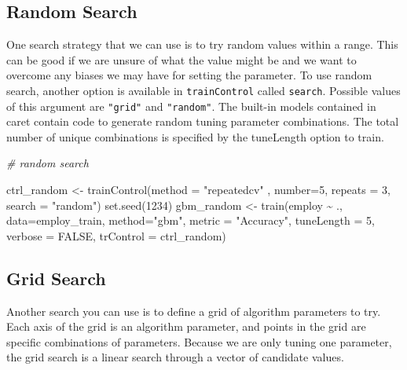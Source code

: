 \documentclass[
]{book}
\newenvironment{Shaded}{\begin{snugshade}}{\end{snugshade}}
\newcommand{\AttributeTok}[1]{\textcolor[rgb]{0.77,0.63,0.00}{#1}}
\newcommand{\CommentTok}[1]{\textcolor[rgb]{0.56,0.35,0.01}{\textit{#1}}}
\newcommand{\ConstantTok}[1]{\textcolor[rgb]{0.00,0.00,0.00}{#1}}
\newcommand{\DecValTok}[1]{\textcolor[rgb]{0.00,0.00,0.81}{#1}}
\newcommand{\FunctionTok}[1]{\textcolor[rgb]{0.00,0.00,0.00}{#1}}
\newcommand{\NormalTok}[1]{#1}
\newcommand{\OtherTok}[1]{\textcolor[rgb]{0.56,0.35,0.01}{#1}}
\newcommand{\SpecialCharTok}[1]{\textcolor[rgb]{0.00,0.00,0.00}{#1}}
\newcommand{\StringTok}[1]{\textcolor[rgb]{0.31,0.60,0.02}{#1}}
\begin{document}
\hypertarget{random-search}{%
\subsection{Random Search}\label{random-search}}

One search strategy that we can use is to try random values within a range. This can be good if we are unsure of what the value might be and we want to overcome any biases we may have for setting the parameter.
To use random search, another option is available in \texttt{trainControl} called \texttt{search}. Possible values of this argument are \texttt{"grid"} and \texttt{"random"}. The built-in models contained in caret contain code to generate random tuning parameter combinations. The total number of unique combinations is specified by the tuneLength option to train.

\begin{Shaded}
\begin{Highlighting}[]
\CommentTok{\# random search}

\NormalTok{ctrl\_random }\OtherTok{\textless{}{-}} \FunctionTok{trainControl}\NormalTok{(}\AttributeTok{method =} \StringTok{"repeatedcv"}\NormalTok{ , }\AttributeTok{number=}\DecValTok{5}\NormalTok{, }
                            \AttributeTok{repeats =} \DecValTok{3}\NormalTok{, }
                           \AttributeTok{search =} \StringTok{"random"}\NormalTok{)}
\FunctionTok{set.seed}\NormalTok{(}\DecValTok{1234}\NormalTok{)}
\NormalTok{gbm\_random }\OtherTok{\textless{}{-}} \FunctionTok{train}\NormalTok{(employ }\SpecialCharTok{\textasciitilde{}}\NormalTok{ ., }\AttributeTok{data=}\NormalTok{employ\_train, }\AttributeTok{method=}\StringTok{"gbm"}\NormalTok{, }
                  \AttributeTok{metric =} \StringTok{"Accuracy"}\NormalTok{, }
                  \AttributeTok{tuneLength =} \DecValTok{5}\NormalTok{, }\AttributeTok{verbose =} \ConstantTok{FALSE}\NormalTok{,}
                  \AttributeTok{trControl =}\NormalTok{ ctrl\_random)}
\end{Highlighting}
\end{Shaded}

\hypertarget{grid-search}{%
\subsection{Grid Search}\label{grid-search}}

Another search you can use is to define a grid of algorithm parameters to try. Each axis of the grid is an algorithm parameter, and points in the grid are specific combinations of parameters.
Because we are only tuning one parameter, the grid search is a linear search through a vector of candidate values.
\end{document}
